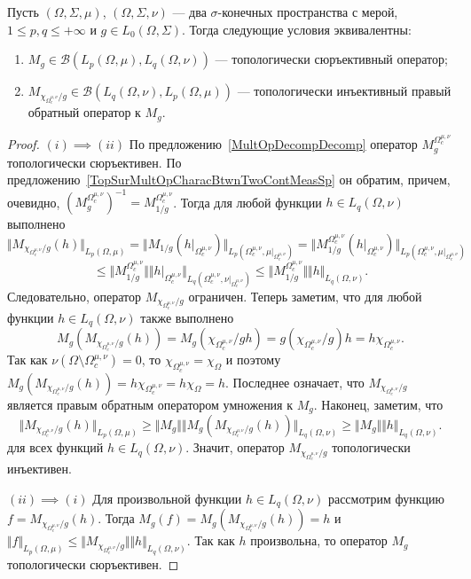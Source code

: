 \begin{proposition}\label{TopSurMultOpDescBtwnTwoMeasSp} Пусть
$(\Omega,\Sigma,\mu)$, $(\Omega,\Sigma,\nu)$ --- два $\sigma$-конечных
пространства с мерой, $1\leq p,q\leq +\infty$ и $g\in L_0(\Omega,\Sigma)$. Тогда
следующие условия эквивалентны:

\begin{enumerate}[label = (\roman*)]
    \item $M_g\in\mathcal{B}(L_p(\Omega,\mu),L_q(\Omega,\nu))$ --- топологически
    сюръективный оператор;

    \item $M_{\chi_{\Omega_c^{\mu,\nu}}/g}\in\mathcal{B}(L_q(\Omega,\nu),
    L_p(\Omega,\mu))$ --- топологически инъективный правый обратный оператор к
    $M_g$.
\end{enumerate}
\end{proposition}
\begin{proof}
$(i) \implies (ii)$ По предложению~\ref{MultOpDecompDecomp} оператор
$M_g^{\Omega_c^{\mu,\nu}}$ топологически сюръективен. По
предложению~\ref{TopSurMultOpCharacBtwnTwoContMeasSp} он обратим, причем,
очевидно, ${(M_g^{\Omega_c^{\mu,\nu}})}^{-1}=M_{1/g}^{\Omega_c^{\mu,\nu}}$. 
Тогда для любой функции $h\in L_q(\Omega,\nu)$ выполнено
$$
\Vert M_{\chi_{\Omega_c^{\mu,\nu}}/g}(h)\Vert_{L_p(\Omega,\mu)}=
\Vert 
    M_{1/g}(h|_{\Omega_c^{\mu,\nu}})
\Vert_{L_p(\Omega_c^{\mu,\nu},\mu|_{\Omega_c^{\mu,\nu}})}
=\Vert 
    M_{1/g}^{\Omega_c^{\mu,\nu}}(h|_{\Omega_c^{\mu,\nu}})
\Vert_{L_p(\Omega_c^{\mu,\nu},\mu|_{\Omega_c^{\mu,\nu}})}
$$
$$
\leq\Vert 
    M_{1/g}^{\Omega_c^{\mu,\nu}}\Vert\Vert h|_{\Omega_c^{\mu,\nu}}
\Vert_{L_q(\Omega_c^{\mu,\nu},\nu|_{\Omega_c^{\mu,\nu}})}
\leq\Vert M_{1/g}^{\Omega_c^{\mu,\nu}}\Vert\Vert h\Vert_{L_q(\Omega,\nu)}.
$$ 
Следовательно, оператор $M_{\chi_{\Omega_c^{\mu,\nu}}/g}$ ограничен. Теперь
заметим, что для любой функции $h\in L_q(\Omega,\nu)$ также выполнено
$$
M_g(M_{\chi_{\Omega_c^{\mu,\nu}}/g}(h))
=M_g(\chi_{\Omega_c^{\mu,\nu}}/g  h)
=g (\chi_{\Omega_c^{\mu,\nu}}/g)   h
=h \chi_{\Omega_c^{\mu,\nu}}.
$$
Так как $\nu(\Omega\setminus\Omega_c^{\mu,\nu})=0$, то
$\chi_{\Omega_c^{\mu,\nu}}=\chi_{\Omega}$ и поэтому
$M_g(M_{\chi_{\Omega_c^{\mu,\nu}}/g}(h))=h \chi_{\Omega_c^{\mu,\nu}}=h
\chi_{\Omega}=h$. Последнее означает, что $M_{\chi_{\Omega_c^{\mu,\nu}}/g}$
является правым обратным оператором умножения к $M_g$. Наконец, заметим, что
$$
\Vert M_{\chi_{\Omega_c^{\mu,\nu}}/g}(h)\Vert_{L_p(\Omega,\mu)}
\geq\Vert M_g\Vert
\Vert M_g(M_{\chi_{\Omega_c^{\mu,\nu}}/g}(h))\Vert_{L_q(\Omega,\nu)}
\geq\Vert M_g\Vert\Vert h\Vert_{L_q(\Omega,\nu)}.
$$
для всех функций $h\in L_q(\Omega,\nu)$. Значит, оператор
$M_{\chi_{\Omega_c^{\mu,\nu}}/g}$ топологически инъективен.

$(ii) \implies (i)$ Для произвольной функции $h\in L_q(\Omega,\nu)$ рассмотрим
функцию $f=M_{\chi_{\Omega_c^{\mu,\nu}}/g}(h)$. Тогда
$M_g(f)=M_g(M_{\chi_{\Omega_c^{\mu,\nu}}/g}(h))=h$ и 
$\Vert f\Vert_{L_p(\Omega,\mu)}
\leq\Vert M_{\chi_{\Omega_c^{\mu,\nu}}/g}\Vert\Vert h\Vert_{L_q(\Omega,\nu)}$. 
Так как $h$ произвольна, то оператор $M_g$ топологически сюръективен.
\end{proof}

